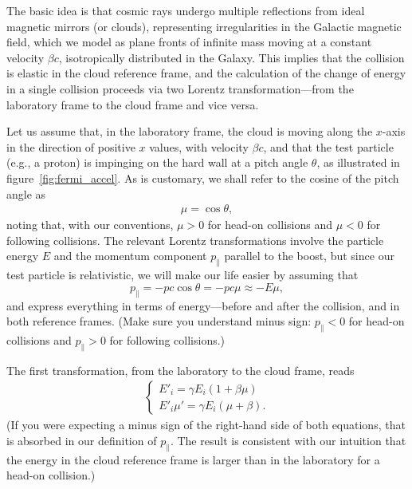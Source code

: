 The basic idea is that cosmic rays undergo multiple reflections from ideal magnetic
mirrors (or clouds),
representing irregularities in the Galactic magnetic field, which we model as plane
fronts of infinite mass moving at a constant velocity $\beta c$, isotropically
distributed in the Galaxy. This implies that the collision is elastic in the cloud
reference frame, and the calculation of the change of energy in a single collision
proceeds via two Lorentz transformation---from the laboratory frame to the cloud
frame and vice versa.

\begin{marginfigure}
  
  
  \caption{Sketch of the Fermi second-order acceleration mechanism, providing the
  relevant setting for the problem for head-on and following collisions.}
  \label{fig:fermi_accel}
\end{marginfigure}

Let us assume that, in the laboratory frame, the cloud is moving along the $x$-axis
in the direction of positive $x$ values, with velocity $\beta c$, and that the test
particle (e.g., a proton) is impinging on the hard wall at a pitch angle $\theta$, as
illustrated in figure~\ref{fig:fermi_accel}. As is customary, we shall refer to
the cosine of the pitch angle as
\begin{align*}
  \mu = \cos\theta,
\end{align*}
noting that, with our conventions, $\mu > 0$ for head-on collisions and $\mu < 0$
for following collisions.
The relevant Lorentz transformations involve the particle energy $E$ and the momentum
component $p_\parallel$ parallel to the boost, but since our test
particle is relativistic, we will make our life easier by assuming that
$$
  p_\parallel = -pc \cos\theta = -pc\mu \approx -E \mu,
$$
and express everything in terms of energy---before and after the collision, and
in both reference frames. (Make sure you understand minus sign: $p_\parallel < 0$
for head-on collisions and $p_\parallel > 0$ for following collisions.)

The first transformation, from the laboratory to the cloud frame, reads
\begin{align}
  \begin{cases}
    E'_i = \gamma E_i (1 + \beta \mu)\\
    E'_i \mu' = \gamma E_i (\mu + \beta).
  \end{cases}
  \tag{Lab $\rightarrow$ Cloud}
\end{align}
(If you were expecting a minus sign of the right-hand side of both equations, that is
absorbed in our definition of $p_\parallel$. The result is consistent with our intuition
that the energy in the cloud reference frame is larger than in the laboratory for a
head-on collision.)

